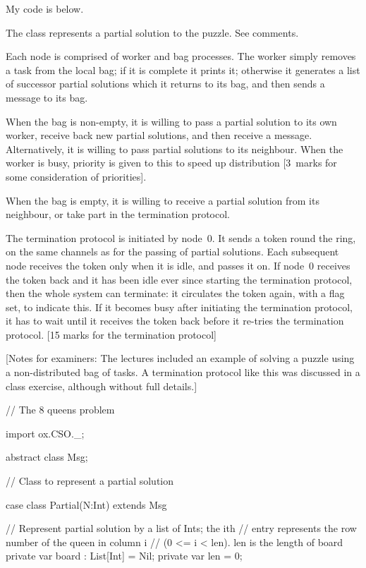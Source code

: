 \begin{answer}
My code is below.

The class  represents a partial solution to the puzzle.  See
comments.

Each node is comprised of worker and bag processes.  The worker simply removes
a task from the local bag; if it is complete it prints it; otherwise it
generates a list of successor partial solutions which it returns to its bag,
and then sends a  message to its bag.

When the bag is non-empty, it is willing to pass a partial solution to its own
worker, receive back new partial solutions, and then receive a 
message.  Alternatively, it is willing to pass partial solutions to its
neighbour.  When the worker is busy, priority is given to this to speed up
distribution [3~marks for some consideration of priorities].

When the bag is empty, it is willing to receive a partial solution from its
neighbour, or take part in the termination protocol.

The termination protocol is initiated by node~0.  It sends a
 token round the ring, on the same channels as for the
passing of partial solutions.  Each subsequent node receives the token only
when it is idle, and passes it on.  If node~0 receives the token back and it
has been idle ever since starting the termination protocol, then the whole
system can terminate: it circulates the token again, with a flag set, to
indicate this.  If it becomes busy after initiating the termination protocol,
it has to wait until it receives the token back before it re-tries the
termination protocol. [15 marks for the termination protocol]

[Notes for examiners: The lectures included an example of solving a puzzle
  using a non-distributed bag of tasks.  A termination protocol like this was
  discussed in a class exercise, although without full details.]

\JavaSize{\footnotesize}
\begin{scala}
// The 8 queens problem

import ox.CSO._;

abstract class Msg;

// Class to represent a partial solution

case class Partial(N:Int) extends Msg{
  // Represent partial solution by a list of Ints; the ith 
  // entry represents the row number of the queen in column i 
  // (0 <= i < len).  len is the length of board
  private var board : List[Int] = Nil;
  private var len = 0;

}
\end{scala}
\end{answer}
